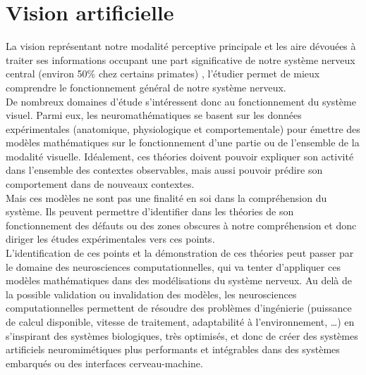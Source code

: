 \section{Vision artificielle}
La vision représentant notre modalité perceptive principale et les aire dévouées à traiter ses informations occupant une part significative de notre système nerveux central (environ 50\% chez certains primates) \autocite{Zhaoping2014}, l'étudier permet de mieux comprendre le fonctionnement général de notre système nerveux.\\
De nombreux domaines d'étude s'intéressent donc au fonctionnement du système visuel. Parmi eux, les neuromathématiques se basent sur les données expérimentales (anatomique, physiologique et comportementale) pour émettre des modèles mathématiques sur le fonctionnement d'une partie ou de l'ensemble de la modalité visuelle. Idéalement, ces théories doivent pouvoir expliquer son activité dans l'ensemble des contextes observables, mais aussi pouvoir prédire son comportement dans de nouveaux contextes\autocite{Zhaoping2014}.\\
Mais ces modèles ne sont pas une finalité en soi dans la compréhension du système. Ils peuvent permettre d'identifier dans les théories de son fonctionnement des défauts ou des zones obscures à notre compréhension et donc diriger les études expérimentales vers ces points\autocite{Zhaoping2014}.\\
L'identification de ces points et la démonstration de ces théories peut passer par le domaine des neurosciences computationnelles, qui va tenter d'appliquer ces modèles mathématiques dans des modélisations du système nerveux. Au delà de la possible validation ou invalidation des modèles, les neurosciences computationnelles permettent de résoudre des problèmes d'ingénierie (puissance de calcul disponible, vitesse de traitement, adaptabilité à l'environnement, \ldots) en s'inspirant des systèmes biologiques, très optimisés, et donc de créer des systèmes artificiels neuromimétiques plus performants et intégrables dans des systèmes embarqués ou des interfaces cerveau-machine.\\


